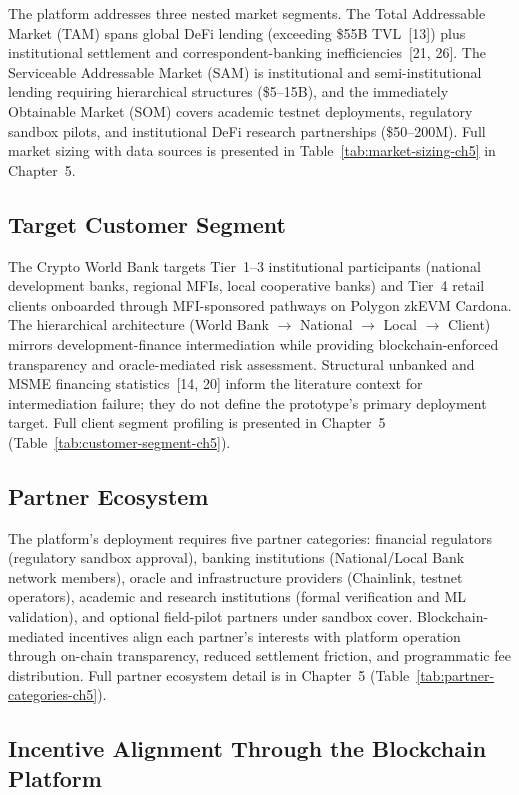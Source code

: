 \documentclass[12pt,a4paper]{report}
\begin{document}
The platform addresses three nested market segments. The Total Addressable Market (TAM) spans global DeFi lending (exceeding \$55B TVL~[13]) plus institutional settlement and correspondent-banking inefficiencies~[21, 26]. The Serviceable Addressable Market (SAM) is institutional and semi-institutional lending requiring hierarchical structures (\$5--15B), and the immediately Obtainable Market (SOM) covers academic testnet deployments, regulatory sandbox pilots, and institutional DeFi research partnerships (\$50--200M). Full market sizing with data sources is presented in Table~\ref{tab:market-sizing-ch5} in Chapter~5.

\subsection{Target Customer Segment}

The Crypto World Bank targets Tier~1--3 institutional participants (national development banks, regional MFIs, local cooperative banks) and Tier~4 retail clients onboarded through MFI-sponsored pathways on Polygon zkEVM Cardona. The hierarchical architecture (World Bank $\to$ National $\to$ Local $\to$ Client) mirrors development-finance intermediation while providing blockchain-enforced transparency and oracle-mediated risk assessment. Structural unbanked and MSME financing statistics~[14, 20] inform the literature context for intermediation failure; they do not define the prototype's primary deployment target. Full client segment profiling is presented in Chapter~5 (Table~\ref{tab:customer-segment-ch5}).

\subsection{Partner Ecosystem}

The platform's deployment requires five partner categories: financial regulators (regulatory sandbox approval), banking institutions (National/Local Bank network members), oracle and infrastructure providers (Chainlink, testnet operators), academic and research institutions (formal verification and ML validation), and optional field-pilot partners under sandbox cover. Blockchain-mediated incentives align each partner's interests with platform operation through on-chain transparency, reduced settlement friction, and programmatic fee distribution. Full partner ecosystem detail is in Chapter~5 (Table~\ref{tab:partner-categories-ch5}).

\subsection{Incentive Alignment Through the Blockchain Platform}
\end{document}
